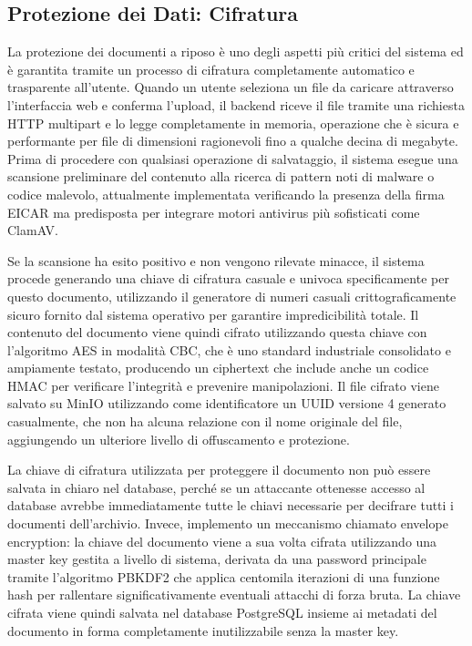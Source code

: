 \documentclass[12pt, a4paper]{article}
\begin{document}
\subsection{Protezione dei Dati: Cifratura}

La protezione dei documenti a riposo è uno degli aspetti più critici del sistema ed è garantita tramite un processo di cifratura completamente automatico e trasparente all'utente. Quando un utente seleziona un file da caricare attraverso l'interfaccia web e conferma l'upload, il backend riceve il file tramite una richiesta HTTP multipart e lo legge completamente in memoria, operazione che è sicura e performante per file di dimensioni ragionevoli fino a qualche decina di megabyte. Prima di procedere con qualsiasi operazione di salvataggio, il sistema esegue una scansione preliminare del contenuto alla ricerca di pattern noti di malware o codice malevolo, attualmente implementata verificando la presenza della firma EICAR ma predisposta per integrare motori antivirus più sofisticati come ClamAV.

Se la scansione ha esito positivo e non vengono rilevate minacce, il sistema procede generando una chiave di cifratura casuale e univoca specificamente per questo documento, utilizzando il generatore di numeri casuali crittograficamente sicuro fornito dal sistema operativo per garantire impredicibilità totale. Il contenuto del documento viene quindi cifrato utilizzando questa chiave con l'algoritmo AES in modalità CBC, che è uno standard industriale consolidato e ampiamente testato, producendo un ciphertext che include anche un codice HMAC per verificare l'integrità e prevenire manipolazioni. Il file cifrato viene salvato su MinIO utilizzando come identificatore un UUID versione 4 generato casualmente, che non ha alcuna relazione con il nome originale del file, aggiungendo un ulteriore livello di offuscamento e protezione.

La chiave di cifratura utilizzata per proteggere il documento non può essere salvata in chiaro nel database, perché se un attaccante ottenesse accesso al database avrebbe immediatamente tutte le chiavi necessarie per decifrare tutti i documenti dell'archivio. Invece, implemento un meccanismo chiamato envelope encryption: la chiave del documento viene a sua volta cifrata utilizzando una master key gestita a livello di sistema, derivata da una password principale tramite l'algoritmo PBKDF2 che applica centomila iterazioni di una funzione hash per rallentare significativamente eventuali attacchi di forza bruta. La chiave cifrata viene quindi salvata nel database PostgreSQL insieme ai metadati del documento in forma completamente inutilizzabile senza la master key.
\end{document}

